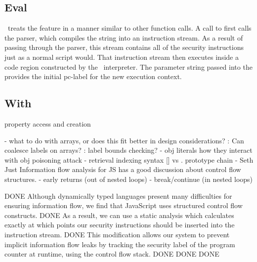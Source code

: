 \subsection{Eval}
\label{sec:eval}
\FlowCore\ treats the  feature in a manner similar to other function calls.
A call to  first calls the parser, which compiles the string into an instruction stream.
As a result of passing through the parser, this stream contains all of the security instructions just as a normal script would.
That instruction stream then executes inside a code region constructed by the \FlowCore\ interpreter.
The parameter string passed into the  provides the initial pc-label for the new execution context.

\subsection{With}
property access and creation


 - what to do with arrays, or does this fit better in design considerations?
   : Can coalesce labels on arrays?
   : label bounds checking? 
 - obj literals
   how they interact with obj poisoning attack
 - retrieval
   indexing syntax [] vs .
   prototype chain
 - Seth Just Information flow analysis for JS has a good discussion about control flow structures.
 - early returns (out of nested loops)
 - break/continue (in nested loops)


DONE Although dynamically typed languages present many difficulties for ensuring information flow, we find that JavaScript uses structured control flow constructs.
DONE As a result, we can use a static analysis which calculates exactly at which points our security instructions should be inserted into the instruction stream.
DONE This modification allows our system to prevent implicit information flow leaks by tracking the security label of the program counter at runtime, using the control flow stack.
DONE %
DONE %
DONE %

